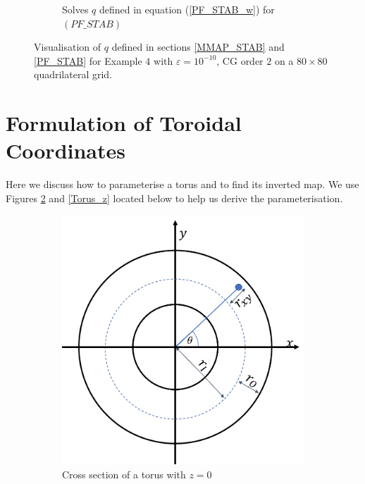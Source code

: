 \documentclass[12pt]{ociamthesis}
\begin{document}
\begin{figure}[H]
\begin{subfigure}{0.5\textwidth}
     \caption{Solves $q$ defined in equation (\ref{PF_STAB_w}) for $(PF\_STAB)$}
 \end{subfigure}
 \caption{Visualisation of $q$ defined in sections \ref{MMAP_STAB} and \ref{PF_STAB} for Example $4$ with $\varepsilon = 10^{-10}$, CG order $2$ on a $80 \times 80$ quadrilateral grid.} \label{E4_Q}
\end{figure}

\section{Formulation of Toroidal Coordinates} \label{Form_Toro}
Here we discuss how to parameterise a torus and to find its inverted map. We use Figures \ref{Torus_XY} and \ref{Torus_z} located below to help us derive the parameterisation.
\begin{figure}[H]
 \begin{subfigure}{0.5\textwidth}
     \includegraphics[width=\textwidth]{Pics/TorusCordsXY.png}
     \caption{Cross section of a torus with $z=0$}
     \label{Torus_XY}
 \end{subfigure}
 \hfill
 \begin{subfigure}{0.5\textwidth}

\end{subfigure}
\end{figure}
\end{document}
